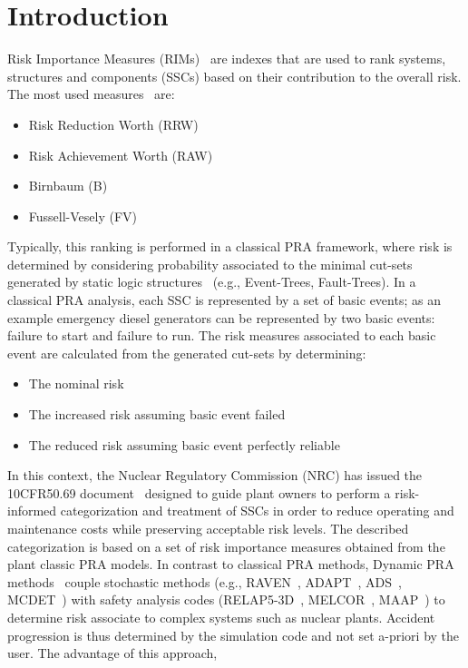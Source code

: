 \section{Introduction}
\label{sec:introduction}

Risk Importance Measures (RIMs)~\cite{} are indexes that are used to rank systems, structures and 
components (SSCs) based on their contribution to the overall risk. The most used measures~\cite{} 
are: 
\begin{itemize}
  \item Risk Reduction Worth (RRW)
  \item Risk Achievement Worth (RAW)
  \item Birnbaum (B)
  \item Fussell-Vesely (FV)
\end{itemize}
Typically, this ranking is performed in a classical PRA framework, where risk is determined by 
considering probability associated to the minimal cut-sets generated by static logic 
structures~\cite{} (e.g., Event-Trees, Fault-Trees). In a classical PRA analysis, each SSC 
is represented by a set of basic events; as an example emergency diesel generators can be 
represented by two basic events: failure to start and failure to run. 
The risk measures associated to each basic event are calculated from the generated cut-sets 
by determining: 
\begin{itemize}
  \item The nominal risk 
  \item The increased risk assuming basic event failed
  \item The reduced risk assuming basic event perfectly reliable 
\end{itemize}
In this context, the Nuclear Regulatory Commission (NRC) has issued the 10CFR50.69 
document~\cite{} designed to guide plant owners to perform a risk-informed categorization and 
treatment of SSCs in order to reduce operating and maintenance costs while preserving 
acceptable risk levels. The described categorization is based on a set of risk importance 
measures obtained from the plant classic PRA models.
In contrast to classical PRA methods, Dynamic PRA methods~\cite{} couple stochastic methods 
(e.g., RAVEN~\cite{}, ADAPT~\cite{}, ADS~\cite{}, MCDET~\cite{}) with safety analysis 
codes (RELAP5-3D~\cite{}, MELCOR~\cite{}, MAAP~\cite{}) to determine risk associate to 
complex systems such as nuclear plants. Accident progression is thus determined by the 
simulation code and not set a-priori by the user. The advantage of this approach, 

